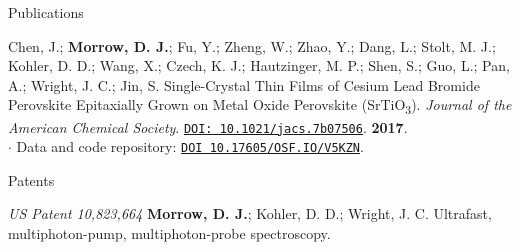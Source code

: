 \documentclass{resume} %
\begin{document}
\begin{rSection}{Publications}
\begin{etaremune}
\item Chen, J.; \textbf{Morrow, D. J.}; Fu, Y.; Zheng, W.; Zhao, Y.; Dang, L.; Stolt, M. J.; Kohler, D. D.; Wang, X.; Czech, K. J.; Hautzinger, M. P.; Shen, S.; Guo, L.; Pan, A.; Wright, J. C.; Jin, S. Single-Crystal Thin Films of Cesium Lead Bromide Perovskite Epitaxially Grown on Metal Oxide Perovskite (SrTiO\textsubscript{3}). \emph{Journal of the American Chemical Society}. \href{http://pubs.acs.org/doi/10.1021/jacs.7b07506}{\texttt{DOI: 10.1021/jacs.7b07506}}. \textbf{2017}. \\
$\cdot$ Data and code repository: \href{https://osf.io/v5kzn/}{\texttt{DOI 10.17605/OSF.IO/V5KZN}}.
	


\end{etaremune}


\end{rSection}

\begin{rSection}{Patents}
	\begin{etaremune}
		\item \textit{US Patent 10,823,664} \textbf{Morrow, D. J.}; Kohler, D. D.; Wright, J. C. Ultrafast, multiphoton-pump, multiphoton-probe spectroscopy. 		
	\end{etaremune}	
\end{rSection}
\end{document}
